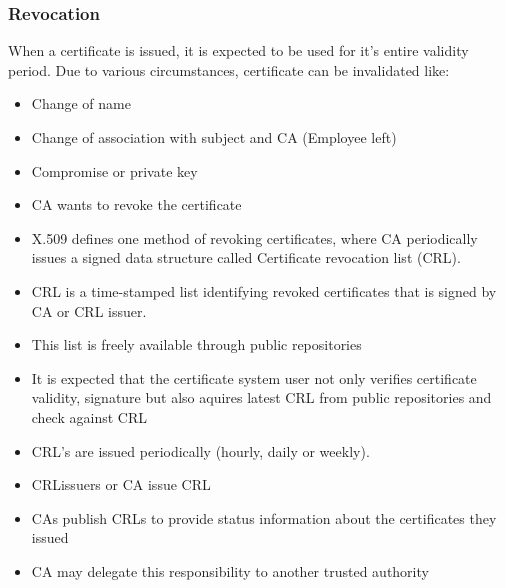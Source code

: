 \documentclass[a4paper]{article}
\begin{document}
    \subsubsection{Revocation}
        When a certificate is issued, it is expected to be used for it's entire validity period. Due to various circumstances, certificate can be invalidated like:
        \begin{itemize}
            \item Change of name
            \item Change of association with subject and CA (Employee left)
            \item Compromise or private key
            \item CA wants to revoke the certificate
        \end{itemize}
        \begin{itemize}
            \item X.509 defines one method of revoking certificates, where CA periodically issues a signed data structure called Certificate revocation list (CRL).
            \item CRL is a time-stamped list identifying revoked certificates that is signed by CA or CRL issuer. 
            \item This list is freely available through public repositories
            \item It is expected that the certificate system user not only verifies certificate validity, signature but also aquires latest CRL from public repositories and check against CRL
            \item CRL's are issued periodically (hourly, daily or weekly). 
            \item CRLissuers or CA issue CRL
            \item CAs publish CRLs to provide status information about the certificates they issued
            \item CA may delegate this responsibility to another trusted authority
        \end{itemize}
\end{document}
